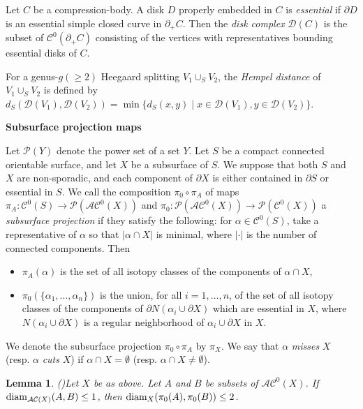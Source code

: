 \documentclass[]{aspm}
\newtheorem{lemma}[definition]{Lemma}
\begin{document}
Let $C$ be a compression-body. 
A disk $D$ properly embedded in $C$ is {\it essential} if $\partial D$ is an essential simple closed curve in $\partial_{+}C$.
Then the {\it disk complex} $\mathcal{D}(C)$ is the subset of $\mathcal{C}^0(\partial_{+}C)$ consisting of the vertices with representatives bounding essential disks of $C$. 

For a genus-$g(\geq 2)$ Heegaard splitting $V_{1}\cup_S V_{2}$, the {\it Hempel distance} of $V_{1}\cup_S V_{2}$ is defined by $d_S(\mathcal{D}(V_{1}),\mathcal{D}(V_{2}))=\min\{d_S(x, y)\mid x\in\mathcal{D}(V_{1}), y\in\mathcal{D}(V_{2})\}$. 


\medskip
\noindent
{\bf Subsurface projection maps}

Let $\mathcal{P}(Y)$ denote the power set of a set $Y$. 
Let $S$ be a compact connected orientable surface, and let $X$ be a subsurface of $S$.
We suppose that both $S$ and $X$ are non-sporadic, and each component of $\partial X$ is either contained in $\partial S$ or essential in $S$. 
We call the composition $\pi_0\circ\pi_A$ of maps $\pi_A:\mathcal{C}^{0}(S)\rightarrow \mathcal{P}(\mathcal{AC}^{0}(X))$ and $\pi_0:\mathcal{P}(\mathcal{AC}^{0}(X))\rightarrow\mathcal{P}(\mathcal{C}^{0}(X))$ a {\it subsurface projection} if they satisfy the following: for $\alpha \in \mathcal{C}^{0}(S)$, take a representative of $\alpha$ 
so that $|\alpha\cap X|$ is minimal, where $|\cdot|$ is the number of connected components. Then 

\begin{itemize}
\item $\pi_{A}(\alpha)$ is the set of all isotopy classes of the components of $\alpha\cap X$,
\item $\pi_0(\{\alpha_1,\dots,\alpha_n\})$ is the union, for all $i=1,\dots,n$, of the set of all isotopy classes of the components of $\partial N(\alpha_{i}\cup\partial X)$ which are essential in $X$, where $N(\alpha_{i}\cup\partial X)$ is a regular neighborhood of $\alpha_i\cup\partial X$ in $X$.
\end{itemize}
We denote the subsurface projection $\pi_0\circ\pi_A$ by $\pi_X$.
We say that $\alpha$ {\it misses} $X$ (resp. $\alpha$ {\it cuts} $X$) if $\alpha\cap X=\emptyset$ (resp. $\alpha\cap X\neq\emptyset$). 


\begin{lemma}(\cite[Lemma 2.2]{MM2})\label{lem-ac-to-c}
Let $X$ be as above. 
Let $A$ and $B$ be subsets of $\mathcal{AC}^0(X)$.
If ${\rm diam}_{\mathcal{AC}(X)}(A, B)\leq 1$, then ${\rm diam}_{X}(\pi_{0}(A), \pi_{0}(B))\leq 2$.
\end{lemma}
\end{document}
